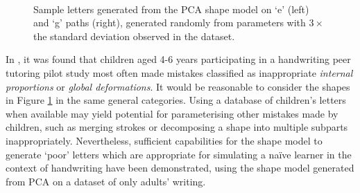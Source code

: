 \documentclass{sig-alternate}
\begin{document}
\begin{figure}[thpb]
\centering
{}
~~~~~
\caption[Sample letters generated from the PCA shape model on `e' and `g'
paths.]{\label{fig:sampleLetters}Sample letters generated from the PCA shape
model on `e' (left) and `g' paths (right), generated randomly from
parameters with $3\times$ the standard deviation observed in the dataset.}

\end{figure}

In \cite{Chandra2013}, it was found that children aged 4-6 years participating
in a handwriting peer tutoring pilot study most often made mistakes classified
as inappropriate \emph{internal proportions} or \emph{global deformations}. It
would be reasonable to consider the shapes in Figure \ref{fig:sampleLetters} in
the same general categories. Using a database of children's letters when
available may yield potential for parameterising other mistakes made by
children, such as merging strokes or decomposing a shape into multiple subparts
inappropriately. Nevertheless, sufficient capabilities for the shape model to
generate `poor' letters which are appropriate for simulating a na\"ive learner
in the context of handwriting have been demonstrated, using the shape model
generated from PCA on a dataset of only adults' writing.
\end{document}
